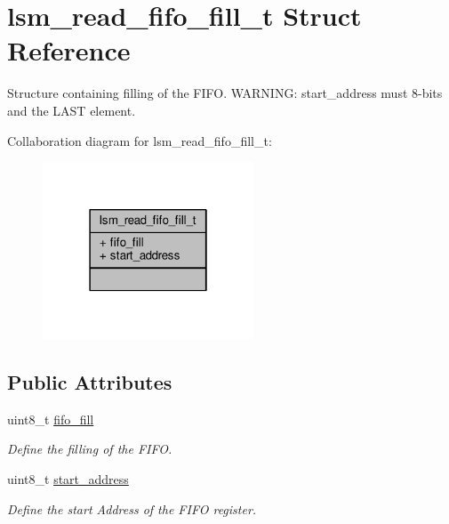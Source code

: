 \hypertarget{structlsm__read__fifo__fill__t}{\section{lsm\+\_\+read\+\_\+fifo\+\_\+fill\+\_\+t Struct Reference}
\label{structlsm__read__fifo__fill__t}
}


Structure containing filling of the F\+I\+F\+O. W\+A\+R\+N\+I\+N\+G\+: start\+\_\+address must 8-\/bits and the L\+A\+S\+T element.  




Collaboration diagram for lsm\+\_\+read\+\_\+fifo\+\_\+fill\+\_\+t\+:
\nopagebreak
\begin{figure}[H]
\begin{center}
\leavevmode
\includegraphics[width=178pt]{structlsm__read__fifo__fill__t__coll__graph}
\end{center}
\end{figure}
\subsection*{Public Attributes}
\begin{DoxyCompactItemize}
\item 
\hypertarget{structlsm__read__fifo__fill__t_a9f787be7c7d76a77cc3748f2e2e744f6}{uint8\+\_\+t \hyperlink{structlsm__read__fifo__fill__t_a9f787be7c7d76a77cc3748f2e2e744f6}{fifo\+\_\+fill}}\label{structlsm__read__fifo__fill__t_a9f787be7c7d76a77cc3748f2e2e744f6}

\begin{DoxyCompactList}\small\item\em Define the filling of the F\+I\+F\+O. \end{DoxyCompactList}\item 
\hypertarget{structlsm__read__fifo__fill__t_a11f4a5609592718f76709c77de5a73c1}{uint8\+\_\+t \hyperlink{structlsm__read__fifo__fill__t_a11f4a5609592718f76709c77de5a73c1}{start\+\_\+address}}\label{structlsm__read__fifo__fill__t_a11f4a5609592718f76709c77de5a73c1}

\begin{DoxyCompactList}\small\item\em Define the start Address of the F\+I\+F\+O register. \end{DoxyCompactList}\end{DoxyCompactItemize}


